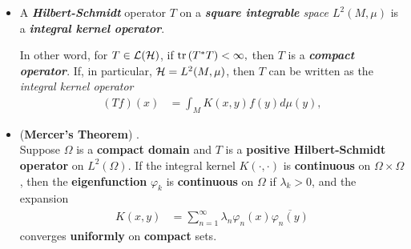 \documentclass[11pt]{article}
\begin{document}
\begin{itemize}
\begin{proof}
We have shown that the map $Κ \mapsto A_K$ is an \emph{\textbf{isometry}} of  $L^2(M \times M, \mu \otimes \mu)$ into $\cB_2(\cH)$, so its \emph{range is \textbf{closed}}. But \emph{\textbf{the finite rank operators}} clearly come from \emph{kernels} and since they are \emph{\textbf{dense}} in $\cB_2(\cH)$ the range of $Κ \mapsto A_K$ is all of $\cB_2(\cH)$.  \qed
\end{proof}



\item \begin{remark}
A \emph{\textbf{Hilbert-Schmidt}} operator $T$ on a \emph{\textbf{square integrable} space $L^2(M, \mu)$} is a \emph{\textbf{integral kernel operator}}.

In other word, for $T \in {\mathcal L}({\mathcal H})$, if $\mathrm{tr}\left(T^{*}T \right) < \infty,$ then $T$ is a \emph{\textbf{compact operator}}. If, in particular, ${\mathcal H} = L^2(M, \mu)$, then $T$ can be written as the \emph{integral kernel operator} 
\begin{align*}
(T f)(x) &= \int_{M} K(x, y)f(y) d\mu(y),
\end{align*}
\end{remark}

\item \begin{theorem}  (\textbf{Mercer's Theorem}) \citep{borthwick2020spectral}. \\
Suppose $\Omega$ is a \textbf{compact domain} and $T$ is a \textbf{positive Hilbert-Schmidt operator} on $L^2(\Omega)$. If the integral kernel $K(\cdot, \cdot)$ is
\textbf{continuous} on $\Omega \times \Omega$, then the \textbf{eigenfunction} $\varphi_k$ is \textbf{continuous} on $\Omega$ if $\lambda_k > 0$, and
the expansion
\begin{align*}
K(x,y) &= \sum_{n=1}^{\infty}\lambda_{n}\varphi_n(x)\overline{\varphi_n(y)}
\end{align*}
converges \textbf{uniformly} on \textbf{compact} sets.
\end{theorem}
\end{itemize}
\end{document}
